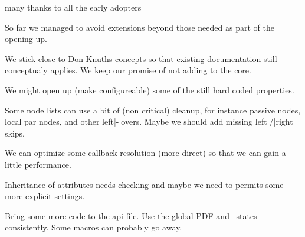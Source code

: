     \vfil \vfil \vfil

    \txx

    many thanks to all the\break
    early adopters

    \vfil

\stopstandardmakeup


\startstandardmakeup


    So far we managed to avoid extensions beyond those needed as part of the opening
    up.

    We stick close to Don Knuths concepts so that existing documentation still
    conceptualy applies. We keep our promise of not adding to the core.

    We might open up (make configureable) some of the still hard coded properties.

\stopstandardmakeup

\startstandardmakeup


    Some node lists can use a bit of (non critical) cleanup, for instance passive
    nodes, local par nodes, and other left|-|overs. Maybe we should add missing
    left|/|right skips.

\stopstandardmakeup

\startstandardmakeup


    We can optimize some callback resolution (more direct) so that we can gain a little
    performance.

\stopstandardmakeup

\startstandardmakeup


    Inheritance of attributes needs checking and maybe we need to permits some more
    explicit settings.

\stopstandardmakeup

\startstandardmakeup


    Bring some more code to the api file. Use the global PDF and \Lua\ states
    consistently. Some macros can probably go away.

\stopstandardmakeup

\startstandardmakeup



